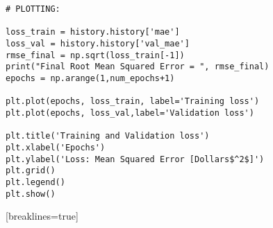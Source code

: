 \documentclass[12pt,a4paper]{article}
\begin{document}
\begin{appendices}
\begin{Verbatim}[breaklines=true]
# PLOTTING:

loss_train = history.history['mae']
loss_val = history.history['val_mae']
rmse_final = np.sqrt(loss_train[-1])
print("Final Root Mean Squared Error = ", rmse_final)
epochs = np.arange(1,num_epochs+1)

plt.plot(epochs, loss_train, label='Training loss')
plt.plot(epochs, loss_val,label='Validation loss')

plt.title('Training and Validation loss')
plt.xlabel('Epochs')
plt.ylabel('Loss: Mean Squared Error [Dollars$^2$]')
plt.grid()
plt.legend()
plt.show()
\end{Verbatim}[breaklines=true]

\end{appendices}
\end{document}
